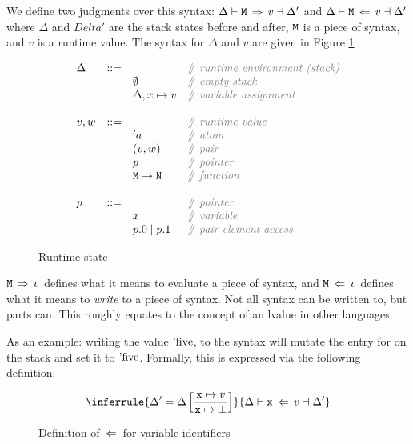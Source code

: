 \documentclass[12pt,twoside]{report}
\begin{document}
We define two judgments over this syntax: $\Delta \vdash \text{\texttt{M}} \,\Rightarrow\, v \dashv \Delta'$ and $\Delta \vdash \text{\texttt{M}} \,\Leftarrow\, v \dashv \Delta'$ where $\Delta$ and $Delta'$ are the stack states before and after, $\text{\texttt{M}}$ is a piece of syntax, and $v$ is a runtime value. The syntax for $\Delta$ and $v$ are given in Figure \ref{fig:stack}

\begin{figure}[H]
  \arraycolsep=1pt %
  \centering

  \vspace{-2ex} %
  \[
  \begin{array}[t]{llll}
    \Delta & ::= & & \comment{runtime environment (stack)} \\
    && \emptyset & \comment{empty stack} \\
    && \Delta, x \mapsto v & \comment{variable assignment} \\
    \\
    v, w & ::= & & \comment{runtime value} \\
    && 'a & \comment{atom} \\
    && (v, w) & \comment{pair} \\
    && p & \comment{pointer} \\
    && \mono{M} \rightarrow \mono{N} & \comment{function} \\
    \\
    p & ::= & & \comment{pointer} \\
    && x & \comment{variable} \\
    && p.0 \mid p.1 & \comment{pair element access} \\
  \end{array} %
  \]
\caption{Runtime state} %
\label{fig:stack} %
\end{figure} %

$\text{\texttt{M}} \,\Rightarrow\, v$ defines what it means to evaluate a piece of syntax, and $\text{\texttt{M}} \,\Leftarrow\, v$ defines what it means to \textit{write} to a piece of syntax. Not all syntax can be written to, but parts can. This roughly equates to the concept of an lvalue in other languages.

As an example: writing the value $\text{'five}$, to the syntax  will mutate the entry for  on the stack and set it to $\text{'five}$. Formally, this is expressed via the following definition:

\begin{figure}[H]
  \begin{gather*}
    \inferrule{
      \Delta' = \Delta\left[\dfrac{\mono{x} \mapsto v}{\mono{x} \mapsto \bot}\right]
    }{
      \Delta \vdash \mono{x} \ewritearrow v \dashv \Delta'
    }
  \end{gather*}
  \caption{Definition of $\,\Leftarrow\,$ for variable identifiers}
\end{figure}
\end{document}
